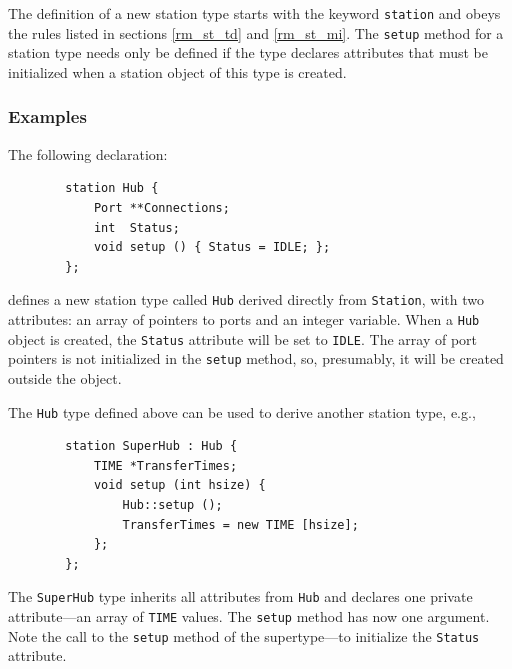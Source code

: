The definition of a new station type starts with the keyword {\tt station}
and obeys the rules listed in sections
\ref{rm_st_td} and \ref{rm_st_mi}.
The {\tt setup} method for a station type needs only be defined if the type
declares attributes that must be initialized when a station
object of this type is created.

\subsubsection*{Examples}

\noindent
The following declaration:
\begin{verbatim}
        station Hub {
            Port **Connections;
            int  Status;
            void setup () { Status = IDLE; };
        };
\end{verbatim}
defines a new station type called {\tt Hub} derived directly from
{\tt Station}, with two attributes: an array of pointers to
ports and an integer
variable.
When a {\tt Hub} object is created, the {\tt Status} attribute will
be set to {\tt IDLE}.
The array of port pointers is not initialized in the {\tt setup} method, so,
presumably, it will be created outside the object.

The {\tt Hub} type defined above can be used to derive another
station type, e.g.,
\begin{verbatim}
        station SuperHub : Hub {
            TIME *TransferTimes;
            void setup (int hsize) {
                Hub::setup ();
                TransferTimes = new TIME [hsize];
            };
        };
\end{verbatim}

The {\tt SuperHub} type inherits all attributes from {\tt Hub} and declares
one private attribute---an array of {\tt TIME} values.
The {\tt setup} method has now one argument.
Note the call to the {\tt setup} method of the supertype---to initialize
the {\tt Status} attribute.

